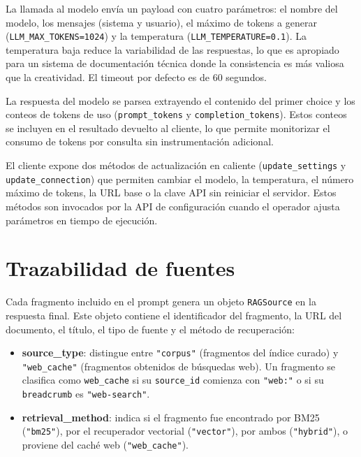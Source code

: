 \documentclass[11pt]{article}
\begin{document}
La llamada al modelo envía un payload con cuatro parámetros: el nombre del modelo, los
mensajes (sistema y usuario), el máximo de tokens a generar (\texttt{LLM\_MAX\_TOKENS=1024})
y la temperatura (\texttt{LLM\_TEMPERATURE=0.1}). La temperatura baja reduce la variabilidad
de las respuestas, lo que es apropiado para un sistema de documentación técnica donde la
consistencia es más valiosa que la creatividad. El timeout por defecto es de 60 segundos.

La respuesta del modelo se parsea extrayendo el contenido del primer choice y los conteos de
tokens de uso (\texttt{prompt\_tokens} y \texttt{completion\_tokens}). Estos conteos se
incluyen en el resultado devuelto al cliente, lo que permite monitorizar el consumo de tokens
por consulta sin instrumentación adicional.

El cliente expone dos métodos de actualización en caliente (\texttt{update\_settings} y
\texttt{update\_connection}) que permiten cambiar el modelo, la temperatura, el número máximo
de tokens, la URL base o la clave API sin reiniciar el servidor. Estos métodos son invocados
por la API de configuración cuando el operador ajusta parámetros en tiempo de ejecución.

\section{Trazabilidad de fuentes}

Cada fragmento incluido en el prompt genera un objeto \texttt{RAGSource} en la respuesta final.
Este objeto contiene el identificador del fragmento, la URL del documento, el título, el tipo
de fuente y el método de recuperación:

\begin{itemize}
\item \textbf{source\_type}: distingue entre \texttt{"corpus"} (fragmentos del índice curado)
      y \texttt{"web\_cache"} (fragmentos obtenidos de búsquedas web). Un fragmento se
      clasifica como \texttt{web\_cache} si su \texttt{source\_id} comienza con \texttt{"web:"}
      o si su \texttt{breadcrumb} es \texttt{"web-search"}.

\item \textbf{retrieval\_method}: indica si el fragmento fue encontrado por BM25
      (\texttt{"bm25"}), por el recuperador vectorial (\texttt{"vector"}), por ambos
      (\texttt{"hybrid"}), o proviene del caché web (\texttt{"web\_cache"}).
\end{itemize}
\end{document}

